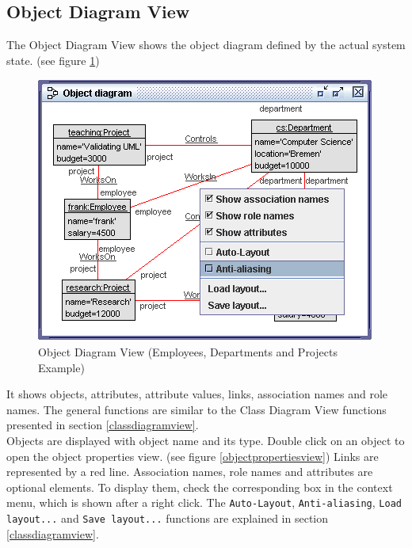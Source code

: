 \documentclass[a4paper,titlepage,oneside,final]{scrreprt} %
\begin{document}
\subsection{Object Diagram View}\label{objectdiagramview}
The Object Diagram View shows the object diagram defined by the actual
system state. (see figure \ref{fig:ObjectDiagramView})
\begin{figure}[ht]
\centering
\includegraphics[scale=0.7]{Screenshots/GUI/Views/ObjectDiagramView.png}
\caption{Object Diagram View (Employees, Departments and Projects Example)}
\label{fig:ObjectDiagramView}
\end{figure}
It shows objects, attributes, attribute values, links, association names
and role names. The general functions are similar to
the Class Diagram View functions presented in section \ref{classdiagramview}.\\
Objects are displayed with object name and its type.
Double click on an object to open the object properties view.
(see figure \ref{objectpropertiesview})
Links are represented by a red line. Association names, role names and attributes
are optional elements. To display them, check the corresponding box in
the context menu, which is shown after a right click.
The \verb+Auto-Layout+, \verb+Anti-aliasing+, \verb+Load layout...+
and \verb+Save layout...+ functions are explained in section \ref{classdiagramview}.
\end{document}
